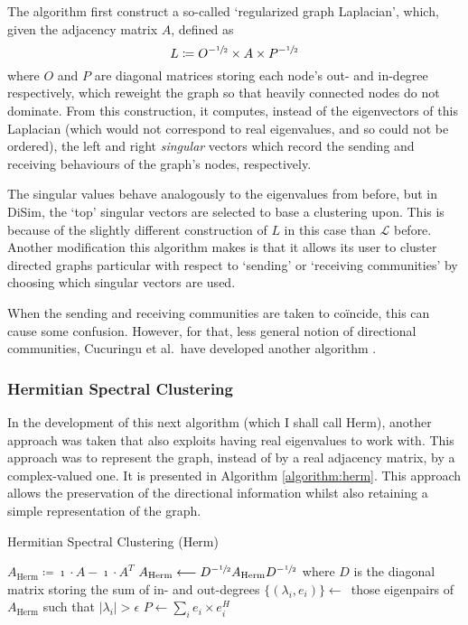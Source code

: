 The algorithm first construct a so-called `regularized graph Laplacian', which, given the 
adjacency matrix $A$, defined as 
$$
	L \coloneqq O^{-\sfrac{1}{2}}\times A\times P^{-\sfrac{1}{2}} 
$$
where $O$ and $P$ are diagonal matrices storing each node's out- and in-degree respectively, 
which reweight the graph so that heavily connected nodes do not dominate. From this construction, it 
computes, instead of the eigenvectors of this Laplacian (which would not correspond to real 
eigenvalues, and so could not be ordered), the left and right \emph{singular} vectors which record 
the sending and receiving behaviours of the graph's nodes, respectively. 

The singular  values behave analogously to the eigenvalues 
from before, but in DiSim, the `top' singular vectors are selected to base a clustering upon. 
This is because of the slightly different construction of $L$ in this case than $\mathcal{L}$ 
before. Another modification this algorithm makes is that it allows its user to cluster directed 
graphs particular with respect to `sending' or `receiving communities' by choosing which singular vectors are used. 

When the sending and receiving communities are taken to co\"incide, this can cause some confusion.
However, for that, less general notion of directional communities, Cucuringu et al.\ have developed
another algorithm \cite{lucapaper}.

\subsubsection{Hermitian Spectral Clustering}
In the development of this next algorithm (which I shall call Herm), another approach was taken 
that also exploits 
having real eigenvalues to work with. This approach was to represent the graph, instead 
of by a real adjacency matrix, by a complex-valued one. It is presented in Algorithm 
\ref{algorithm:herm}. This approach allows the preservation of the directional information whilst 
also retaining a simple representation of the graph. 
\begin{algorithm}
	\caption{Hermitian Spectral Clustering (Herm) \label{algorithm:herm}}
	\BlankLine
	$A_\mathrm{Herm} \coloneqq \imath \cdot A - \imath\cdot A^T$\;
	$A_\mathrm{Herm} \longleftarrow D^{-\sfrac12} A_\mathrm{Herm} D^{-\sfrac12}$ where $D$ is
	the diagonal matrix storing the sum of in- and out-degrees\;
	$\{(\lambda_i, e_i)\} \longleftarrow$\ those eigenpairs of $A_\mathrm{Herm}$ such that 
	$|\lambda_i| > \epsilon$\;
	$P \longleftarrow \sum_i e_i \times e_i^H$\;
\end{algorithm}

